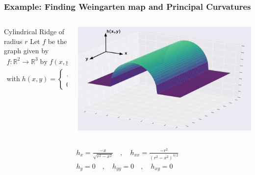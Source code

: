 \documentclass[9pt,notes]{beamer}
\newcommand{\R}{\mathbb{R}} %
\begin{document}
\begin{frame}
  \frametitle{Example: Finding Weingarten map and Principal Curvatures}

\begin{columns}
  \begin{column}{0.5\textwidth}
    \begin{block}{Cylindrical Ridge of radius $r$}
    Let $f$ be the graph given by 
    \begin{gather*}
    f: \R^2 \to \R^3 \;\textrm{by}\; f(x,y) = (x,y,h(x,y)), \\
    \textrm{with}\;
    h(x,y) = \begin{cases}
    \sqrt{r^2 - x^2} & -r < x < r \\
    0 & \textrm{else}
    \end{cases}
    \end{gather*}
  \end{block}
  \end{column}

\begin{column}{0.5\textwidth}
  \includegraphics[width=\linewidth]{circular_trough_with_axes}
\end{column}
\end{columns}


\begin{gather*}
h_x = \frac{-x}{\sqrt{r^2 - x^2}}
\quad , \quad
h_{xx} = \frac{-r^2}{\left(r^2 - x^2\right)^{3/2}}\\
h_y = 0
\quad , \quad
h_{yy} = 0 \quad,\quad h_{xy} = 0
\end{gather*}
\end{frame}
\end{document}
